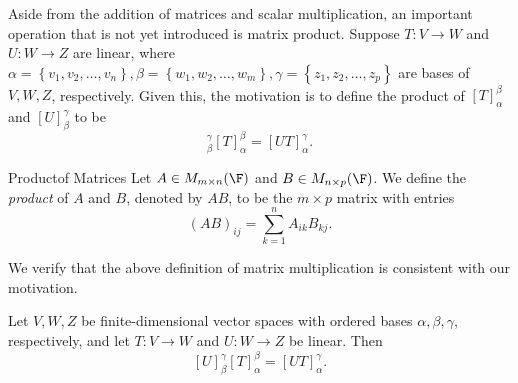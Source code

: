 \documentclass[linearalgebraI]{subfiles}
\begin{document}
    \begin{remark}
        Aside from the addition of matrices and scalar multiplication, an important operation that is not yet introduced is matrix product. Suppose $T: V\to W$ and $U: W\to Z$ are linear, where $\alpha = \left\lbrace v_1, v_2, \ldots, v_n \right\rbrace, \beta = \left\lbrace w_1, w_2, \ldots, w_m \right\rbrace, \gamma = \left\lbrace z_1, z_2, \ldots, z_p \right\rbrace$ are bases of $V, W, Z$, respectively. Given this, the motivation is to define the product of $[T]^\beta_\alpha$ and $[U]^\gamma_\beta$ to be
        \begin{equation*}
            [U]^\gamma_\beta [T]^\beta_\alpha = [UT]^\gamma_\alpha.
        \end{equation*}
    \end{remark}

    \begin{definition}{Product}{of Matrices}
        Let $A\in M_{m\times n}(\F)$ and $B\in M_{n\times p}(\F)$. We define the \emph{product} of $A$ and $B$, denoted by $AB$, to be the $m\times p$ matrix with entries
        \begin{equation*}
            \left( AB \right) _{ij} = \sum^{n}_{k=1} A_{ik}B_{kj}.
        \end{equation*}
    \end{definition}

    \begin{remark}
        We verify that the above definition of matrix multiplication is consistent with our motivation. 
    \end{remark}

    \begin{prop}{}
        Let $V, W, Z$ be finite-dimensional vector spaces with ordered bases $\alpha, \beta, \gamma$, respectively, and let $T:V\to W$ and $U:W\to Z$ be linear. Then
        \begin{equation*}
            \left[ U \right] ^\gamma_\beta \left[ T \right] ^\beta_\alpha = \left[ UT \right] ^\gamma_\alpha.
        \end{equation*}
    \end{prop}
\end{document}
